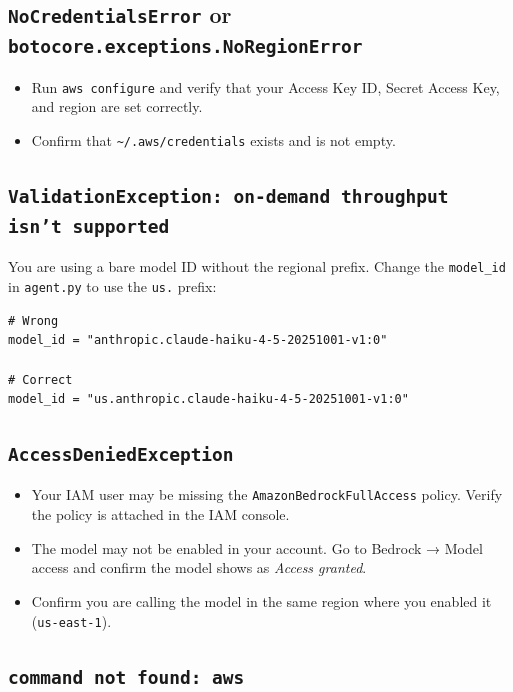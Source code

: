 \documentclass[12pt, a4paper]{article}
\begin{document}
\subsection{\texttt{NoCredentialsError} or \texttt{botocore.exceptions.NoRegionError}}

\begin{itemize}[leftmargin=1.5em]
  \item Run \texttt{aws configure} and verify that your Access Key ID, Secret Access Key, and region are set correctly.
  \item Confirm that \texttt{\textasciitilde/.aws/credentials} exists and is not empty.
\end{itemize}

\subsection{\texttt{ValidationException: on-demand throughput isn't supported}}

You are using a bare model ID without the regional prefix. Change the \texttt{model\_id} in \texttt{agent.py} to use the \texttt{us.} prefix:

\begin{lstlisting}[language={}]
# Wrong
model_id = "anthropic.claude-haiku-4-5-20251001-v1:0"

# Correct
model_id = "us.anthropic.claude-haiku-4-5-20251001-v1:0"
\end{lstlisting}

\subsection{\texttt{AccessDeniedException}}

\begin{itemize}[leftmargin=1.5em]
  \item Your IAM user may be missing the \texttt{AmazonBedrockFullAccess} policy. Verify the policy is attached in the IAM console.
  \item The model may not be enabled in your account. Go to Bedrock → Model access and confirm the model shows as \textit{Access granted}.
  \item Confirm you are calling the model in the same region where you enabled it (\texttt{us-east-1}).
\end{itemize}

\subsection{\texttt{command not found: aws}}
\end{document}

